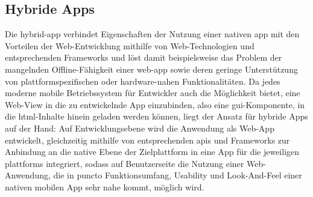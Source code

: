 \subsection{Hybride Apps} \label{sec:hybrid-app}

Die \gls{hybrid-app} verbindet Eigenschaften der Nutzung einer nativen \gls{app} mit den Vorteilen der Web-Entwicklung mithilfe von Web-Technologien und entsprechenden Frameworks und löst damit beispielsweise das Problem der mangelnden Offline-Fähigkeit einer \gls{web-app} sowie deren geringe Unterstützung von plattformspezifischen oder hardware-nahen Funktionalitäten. 
Da jedes moderne mobile Betriebssystem für Entwickler auch die Möglichkeit bietet, eine Web-View in die zu entwickelnde App einzubinden, also eine \gls{gui}-Komponente, in die \gls{html}-Inhalte hinein geladen werden können, liegt der Ansatz für hybride Apps auf der Hand: Auf Entwicklungsebene wird die Anwendung als Web-App entwickelt, gleichzeitig mithilfe von entsprechenden \glspl{api} und Frameworks zur Anbindung an die native Ebene der Zielplattform in eine App für die jeweiligen \glspl{plattform} integriert, sodass auf Benutzerseite die Nutzung einer Web-Anwendung, die in puncto Funktionsumfang, Usability und Look-And-Feel einer nativen mobilen App sehr nahe kommt, möglich wird.

